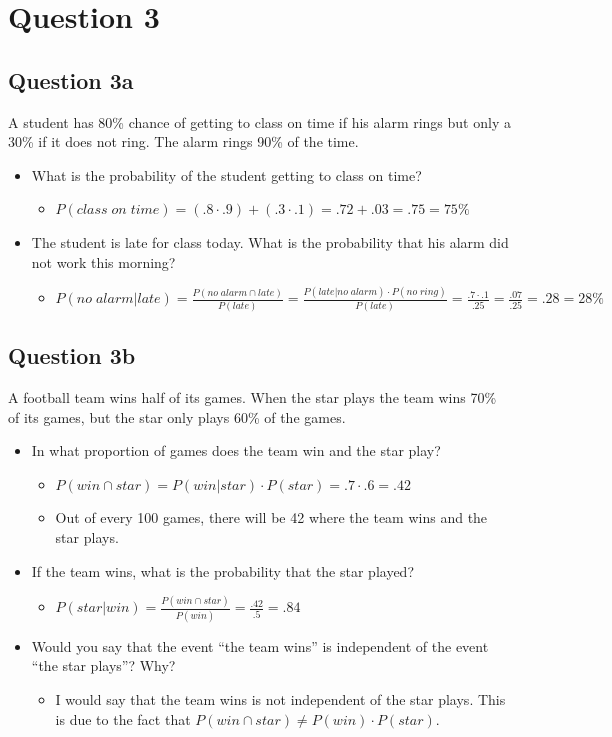 \documentclass[12pt]{article}
\begin{document}
\section*{Question 3}
\subsection*{Question 3a}
A student has 80\% chance of getting to class on time if his alarm rings but only a 30\% if it does not ring. The alarm rings 90\% of the time.
  \begin{itemize}
    \item What is the probability of the student getting to class on time?
    \begin{itemize}
      \item $P(class\; on\; time)= (.8 \cdot .9)+(.3 \cdot .1)=.72+.03=.75=75\%$
    \end{itemize}
    \item The student is late for class today. What is the probability that his alarm did not work this morning?
    \begin{itemize}
      \item $P(no\;alarm|late)=\frac{P(no\;alarm\cap late)}{P(late)}=\frac{P(late|no\;alarm)\cdot P(no\;ring)}{P(late)}= \frac{.7\cdot .1}{.25}=\frac{.07}{.25}=.28=28\%$
    \end{itemize}
  \end{itemize}
\subsection*{Question 3b}
A football team wins half of its games. When the star plays the team wins 70\% of its games, but the star only plays 60\% of the games.
\begin{itemize}
  \item In what proportion of games does the team win and the star play?
  \begin{itemize}
    \item $P(win \cap star)=P(win|star)\cdot P(star)= .7 \cdot .6= .42$
    \item Out of every 100 games, there will be 42 where the team wins and the star plays.
  \end{itemize}
  \item If the team wins, what is the probability that the star played?
  \begin{itemize}
    \item $P(star|win)=\frac{P(win \cap star)}{P(win)}=\frac{.42}{.5}=.84$
  \end{itemize}
  \item Would you say that the event ``the team wins'' is independent of the event ``the star plays''? Why?
  \begin{itemize}
    \item I would say that the team wins is not independent of the star plays. This is due to the fact that $P(win \cap star) \neq P(win)\cdot P(star)$.
  \end{itemize}
\end{itemize}
\end{document}
